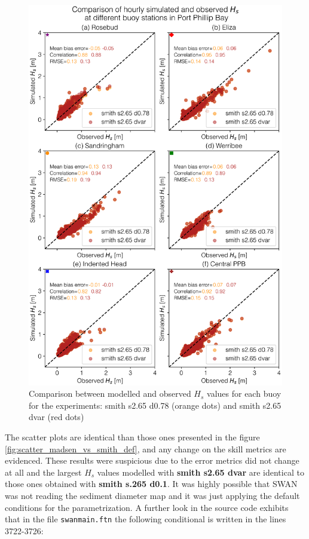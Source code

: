\documentclass[12pt]{article}
\begin{document}
\begin{figure}[H]
    \centering
    \includegraphics[scale=0.7]{plots/scatter/smith s2.65 d0.78_vs_smith s2.65 dvar_vert_sca.png}
    \caption{Comparison between modelled and observed $H_{s}$ values for each buoy for the experiments: smith s2.65 d0.78 (orange dots) and smith s2.65 dvar (red dots)}
    \label{fig:scatter_smith_0.78_vs_smith_dvar}
\end{figure}

The scatter plots are identical than those ones presented in the figure \ref{fig:scatter_madsen_vs_smith_def}, and any change on the skill metrics are evidenced. These results were suspicious due to the error metrics did not change at all and the largest $H_s$ values modelled with \textbf{smith s2.65 dvar} are identical to those ones obtained with \textbf{smith s.265 d0.1}. It was highly possible that SWAN was not reading the sediment diameter map and it was just applying the default conditions for the \textcite{Smith2011} parametrization. A further look in the source code exhibits that in the file \verb|swanmain.ftn| the following conditional is written in the lines 3722-3726:
\end{document}

